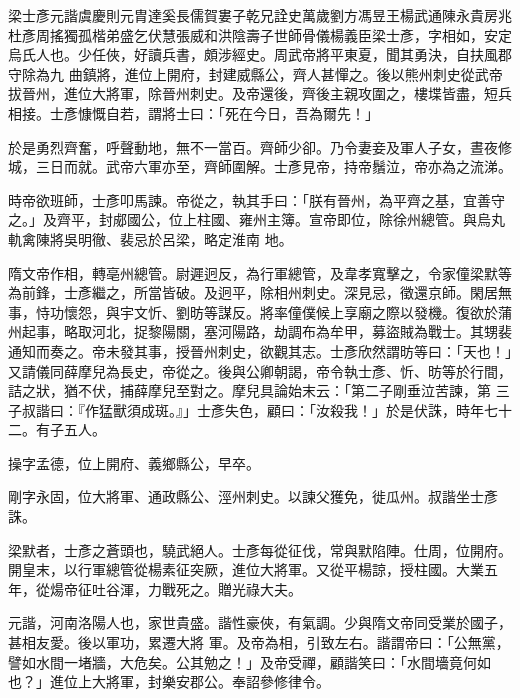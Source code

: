 
\begin{pinyinscope}

 梁士彥元諧虞慶則元胄達奚長儒賀婁子乾兄詮史萬歲劉方馮昱王楊武通陳永貴房兆杜彥周搖獨孤楷弟盛乞伏慧張威和洪陰壽子世師骨儀楊義臣梁士彥，字相如，安定烏氏人也。少任俠，好讀兵書，頗涉經史。周武帝將平東夏，聞其勇決，自扶風郡守除為九
 曲鎮將，進位上開府，封建威縣公，齊人甚憚之。後以熊州刺史從武帝拔晉州，進位大將軍，除晉州刺史。及帝還後，齊後主親攻圍之，樓堞皆盡，短兵相接。士彥慷慨自若，謂將士曰：「死在今日，吾為爾先！」



 於是勇烈齊奮，呼聲動地，無不一當百。齊師少卻。乃令妻妾及軍人子女，晝夜修城，三日而就。武帝六軍亦至，齊師圍解。士彥見帝，持帝鬚泣，帝亦為之流涕。



 時帝欲班師，士彥叩馬諫。帝從之，執其手曰：「朕有晉州，為平齊之基，宜善守之。」及齊平，封郕國公，位上柱國、雍州主簿。宣帝即位，除徐州總管。與烏丸軌禽陳將吳明徹、裴忌於呂梁，略定淮南
 地。



 隋文帝作相，轉亳州總管。尉遲迥反，為行軍總管，及韋孝寬擊之，令家僮梁默等為前鋒，士彥繼之，所當皆破。及迥平，除相州刺史。深見忌，徵還京師。閑居無事，恃功懷怨，與宇文忻、劉昉等謀反。將率僮僕候上享廟之際以發機。復欲於蒲州起事，略取河北，捉黎陽關，塞河陽路，劫調布為牟甲，募盜賊為戰士。其甥裴通知而奏之。帝未發其事，授晉州刺史，欲觀其志。士彥欣然謂昉等曰：「天也！」又請儀同薛摩兒為長史，帝從之。後與公卿朝謁，帝令執士彥、忻、昉等於行間，詰之狀，猶不伏，捕薛摩兒至對之。摩兒具論始末云：「第二子剛垂泣苦諫，第
 三子叔諧曰：『作猛獸須成斑。』」士彥失色，顧曰：「汝殺我！」於是伏誅，時年七十二。有子五人。



 操字孟德，位上開府、義鄉縣公，早卒。



 剛字永固，位大將軍、通政縣公、涇州刺史。以諫父獲免，徙瓜州。叔諧坐士彥誅。



 梁默者，士彥之蒼頭也，驍武絕人。士彥每從征伐，常與默陷陣。仕周，位開府。開皇末，以行軍總管從楊素征突厥，進位大將軍。又從平楊諒，授柱國。大業五年，從煬帝征吐谷渾，力戰死之。贈光祿大夫。



 元諧，河南洛陽人也，家世貴盛。諧性豪俠，有氣調。少與隋文帝同受業於國子，甚相友愛。後以軍功，累遷大將
 軍。及帝為相，引致左右。諧謂帝曰：「公無黨，譬如水間一堵牆，大危矣。公其勉之！」及帝受禪，顧諧笑曰：「水間墻竟何如也？」進位上大將軍，封樂安郡公。奉詔參修律令。




\end{pinyinscope}
